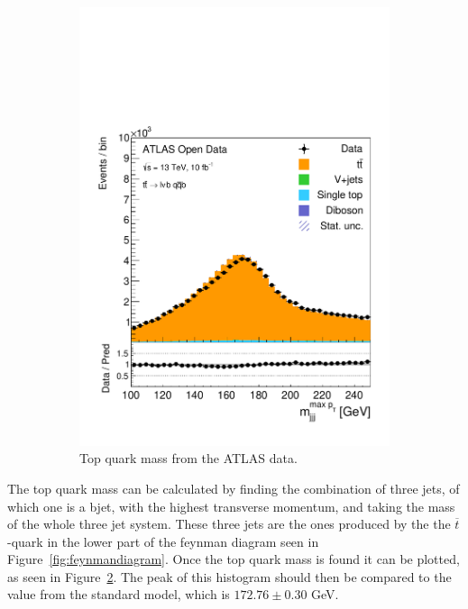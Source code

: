 \documentclass[12pt,a4paper]{article}
\numberwithin{equation}{section}
\begin{document}
\begin{figure}[t!]
\begin{subfigure}[t]{0.47\textwidth}
      \centering
      \includegraphics[width=1.0\textwidth]{figures/hist_Topmass}
      \caption{\label{fig:topmass}Top quark mass from the ATLAS data.}
    \end{subfigure}
    \caption{}
\end{figure}

The top quark mass can be calculated by finding the combination of three jets,
of which one is a bjet, with the highest transverse momentum, and taking the
mass of the whole three jet system. These three jets are the ones produced by
the the $\overline{t}$-quark in the lower part of the feynman diagram seen in
Figure~\ref{fig:feynmandiagram}.
Once the top quark mass is found it can be plotted, as seen in
Figure~\ref{fig:topmass}. The peak of this histogram should then be compared to
the value from the standard model, which is $172.76 \pm 0.30$ GeV\cite{pdg}.
\end{document}

